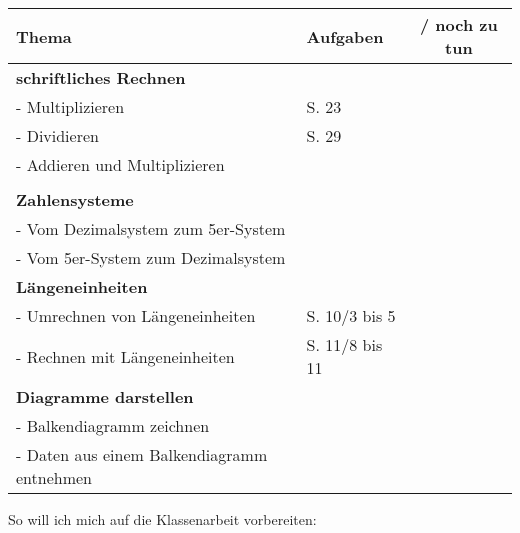 \documentclass[a5paper,landscape]{scrartcl}
\begin{document}
\noindent
\begin{center}
\begin{tabular}{llc}
	\textbf{Thema} &  \textbf{Aufgaben} & \checkmark{} / noch zu tun\\
	\toprule
	\textbf{schriftliches Rechnen}  & \\
	- Multiplizieren & S. 23\\
	- Dividieren & S. 29\\
	- Addieren und Multiplizieren &  \\ \\
	\midrule
	\textbf{Zahlensysteme}  & \\
	- Vom Dezimalsystem zum 5er-System& \\
	- Vom 5er-System zum Dezimalsystem & \\
	\midrule
	\textbf{Längeneinheiten} & \\
	- Umrechnen von Längeneinheiten & S. 10/3 bis 5\\
	- Rechnen mit Längeneinheiten & S. 11/8 bis 11\\
	\midrule
	\textbf{Diagramme darstellen} & \\
	- Balkendiagramm zeichnen & \\
	- Daten aus einem Balkendiagramm entnehmen & \\
\end{tabular}
\end{center}
So will ich mich auf die Klassenarbeit vorbereiten:
\end{document}
